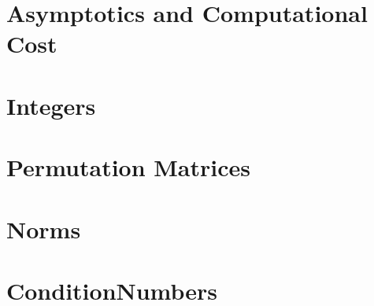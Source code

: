 \documentclass[12pt,a4paper]{book}
\theoremstyle{definition}
\begin{document}
\appendix

\chapter{Asymptotics and Computational Cost}


\chapter{Integers}


\chapter{Permutation Matrices}


\chapter{Norms}


\chapter{ConditionNumbers}

\end{document}
